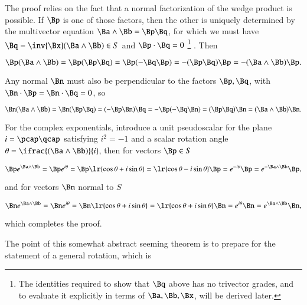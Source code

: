 The proof relies on the fact that a normal factorization of the wedge product is possible.
If \( \Bp \) is one of those factors, then the other is uniquely determined by the multivector equation \( \Ba \wedge \Bb = \Bp \Bq \), for which we must have \( \Bq = \inv{\Bx}(\Ba \wedge \Bb) \in S \) and \( \Bp \cdot \Bq = 0 \)
\footnote{The identities required to show that \( \Bq \) above has no trivector grades, and to evaluate it explicitly in terms of \( \Ba, \Bb, \Bx \), will be derived later.}
.
Then

\begin{dmath}\label{eqn:wedgeProductArea:1780}
\Bp (\Ba \wedge \Bb)
= \Bp (\Bp \Bq)
= \Bp (-\Bq \Bp)
= -(\Bp \Bq) \Bp
=
-(\Ba \wedge \Bb) \Bp.
\end{dmath}

Any normal \( \Bn \) must also be perpendicular to the factors \( \Bp, \Bq \), with \( \Bn \cdot \Bp = \Bn \cdot \Bq = 0 \), so

\begin{dmath}\label{eqn:wedgeProductArea:1800}
\Bn (\Ba \wedge \Bb)
= \Bn (\Bp \Bq)
= (-\Bp \Bn) \Bq
= -\Bp (-\Bq \Bn)
= (\Bp \Bq) \Bn
=
(\Ba \wedge \Bb) \Bn.
\end{dmath}

For the complex exponentials, introduce a unit pseudoscalar for the plane \( i = \pcap \qcap \) satisfying \( i^2 = -1 \) and a scalar rotation angle \( \theta = \ifrac{ (\Ba \wedge \Bb) }{i} \), then for vectors \( \Bp \in S \)

\begin{dmath}\label{eqn:generalRotation:1840}
\Bp e^{ \Ba \wedge \Bb }
=
\Bp e^{ i \theta }
=
\Bp \lr{ \cos\theta + i \sin\theta }
=
\lr{ \cos\theta - i \sin\theta } \Bp
=
e^{-i\theta} \Bp
=
e^{- \Ba \wedge \Bb} \Bp,
\end{dmath}

and for vectors \( \Bn \) normal to \( S \)

\begin{dmath}\label{eqn:generalRotation:1860}
\Bn e^{ \Ba \wedge \Bb }
=
\Bn e^{ i \theta }
=
\Bn \lr{ \cos\theta + i \sin\theta }
=
\lr{ \cos\theta + i \sin\theta } \Bn
=
e^{i\theta} \Bn
=
e^{\Ba \wedge \Bb} \Bn,
\end{dmath}

which completes the proof.

The point of this somewhat abstract seeming theorem is to prepare for the statement of a general  rotation, which is


